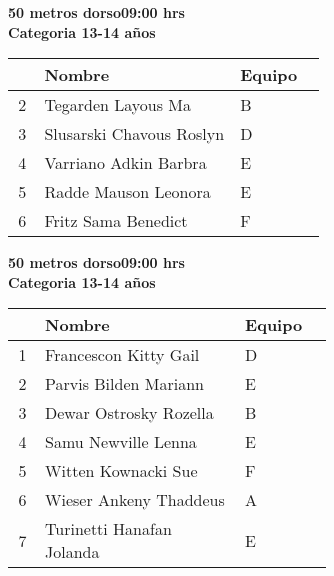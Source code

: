 \begin{minipage}{0.95\linewidth}\vspace{0.5cm} 
\begin{flushleft}
\textbf{
\hspace{-0.15cm}50 metros dorso\hspace{1.5cm}09:00 hrs \\Categoria 13-14 años}\vspace{-0.2cm} 
\end{flushleft}
\begin{tabular}{cp{0.63\linewidth}l}
\hline
& \textbf{Nombre} & \textbf{Equipo} \\ \hline
2 & Tegarden Layous Ma & B \\ 
3 & Slusarski Chavous Roslyn & D \\ 
4 & Varriano Adkin Barbra & E \\ 
5 & Radde Mauson Leonora & E \\ 
6 & Fritz Sama Benedict & F \\ 
\end{tabular}
\end{minipage}
\begin{minipage}{0.95\linewidth}\vspace{0.5cm} 
\begin{flushleft}
\textbf{
\hspace{-0.15cm}50 metros dorso\hspace{1.5cm}09:00 hrs \\Categoria 13-14 años}\vspace{-0.2cm} 
\end{flushleft}
\begin{tabular}{cp{0.63\linewidth}l}
\hline
& \textbf{Nombre} & \textbf{Equipo} \\ \hline
1 & Francescon Kitty Gail & D \\ 
2 & Parvis Bilden Mariann & E \\ 
3 & Dewar Ostrosky Rozella & B \\ 
4 & Samu Newville Lenna & E \\ 
5 & Witten Kownacki Sue & F \\ 
6 & Wieser Ankeny Thaddeus & A \\ 
7 & Turinetti Hanafan Jolanda & E \\ 
\end{tabular}
\end{minipage}
